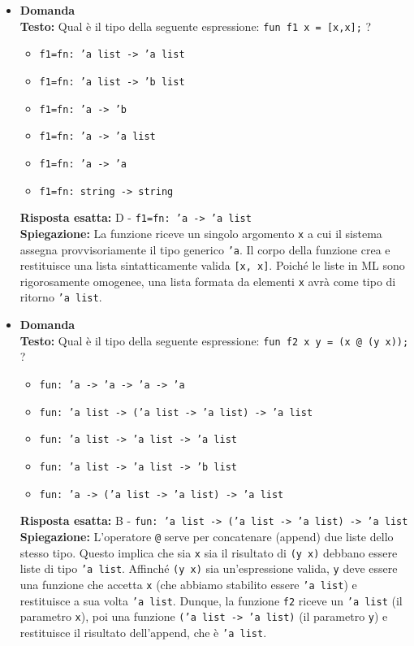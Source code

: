 \documentclass[12pt, a4paper]{article}
\newcounter{domandateoria}
\begin{document}
\begin{itemize}
    \item {}\textbf{Domanda \thedomandateoria} \\
    \textbf{Testo:} Qual è il tipo della seguente espressione: \texttt{fun f1 x = [x,x];} ?
    \begin{itemize}
        \item[A)] \texttt{f1=fn: 'a list -> 'a list}
        \item[B)] \texttt{f1=fn: 'a list -> 'b list}
        \item[C)] \texttt{f1=fn: 'a -> 'b}
        \item[D)] \texttt{f1=fn: 'a -> 'a list}
        \item[E)] \texttt{f1=fn: 'a -> 'a}
        \item[F)] \texttt{f1=fn: string -> string}
    \end{itemize}
    \textbf{Risposta esatta:} D - \texttt{f1=fn: 'a -> 'a list} \\
    \textbf{Spiegazione:} La funzione riceve un singolo argomento \texttt{x} a cui il sistema assegna provvisoriamente il tipo generico \texttt{'a}. Il corpo della funzione crea e restituisce una lista sintatticamente valida \texttt{[x, x]}. Poiché le liste in ML sono rigorosamente omogenee, una lista formata da elementi \texttt{x} avrà come tipo di ritorno \texttt{'a list}. 
    \vspace{0.3cm}

\item {}\textbf{Domanda \thedomandateoria} \\
    \textbf{Testo:} Qual è il tipo della seguente espressione: \texttt{fun f2 x y = (x @ (y x));} ?
    \begin{itemize}
        \item[A)] \texttt{fun: 'a -> 'a -> 'a -> 'a}
        \item[B)] \texttt{fun: 'a list -> ('a list -> 'a list) -> 'a list}
        \item[C)] \texttt{fun: 'a list -> 'a list -> 'a list}
        \item[D)] \texttt{fun: 'a list -> 'a list -> 'b list}
        \item[E)] \texttt{fun: 'a -> ('a list -> 'a list) -> 'a list}
    \end{itemize}
    \textbf{Risposta esatta:} B - \texttt{fun: 'a list -> ('a list -> 'a list) -> 'a list} \\
    \textbf{Spiegazione:} L'operatore \texttt{@} serve per concatenare (append) due liste dello stesso tipo. Questo implica che sia \texttt{x} sia il risultato di \texttt{(y x)} debbano essere liste di tipo \texttt{'a list}. Affinché \texttt{(y x)} sia un'espressione valida, \texttt{y} deve essere una funzione che accetta \texttt{x} (che abbiamo stabilito essere \texttt{'a list}) e restituisce a sua volta \texttt{'a list}. Dunque, la funzione \texttt{f2} riceve un \texttt{'a list} (il parametro \texttt{x}), poi una funzione \texttt{('a list -> 'a list)} (il parametro \texttt{y}) e restituisce il risultato dell'append, che è \texttt{'a list}.
    \vspace{0.3cm}


\end{itemize}
\end{document}
